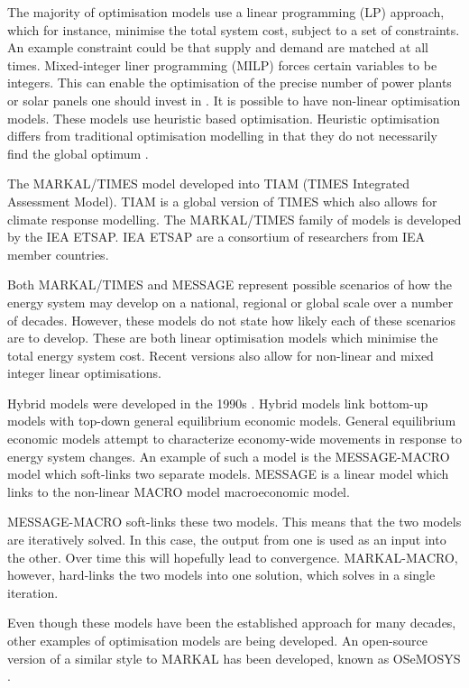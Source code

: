 The majority of optimisation models use a linear programming (LP) approach, which for instance, minimise the total system cost, subject to a set of constraints. An example constraint could be that supply and demand are matched at all times. Mixed-integer liner programming (MILP) forces certain variables to be integers. This can enable the optimisation of the precise number of power plants or solar panels one should invest in \cite{Ringkjob2018}. It is possible to have non-linear optimisation models. These models use heuristic based optimisation. Heuristic optimisation differs from traditional optimisation modelling in that they do not necessarily find the global optimum \cite{Banos2011}.  

The MARKAL/TIMES model developed into TIAM (TIMES Integrated Assessment Model). TIAM is a global version of TIMES which also allows for climate response modelling. The MARKAL/TIMES family of models is developed by the IEA ETSAP. IEA ETSAP are a consortium of researchers from IEA member countries.

Both MARKAL/TIMES and MESSAGE represent possible scenarios of how the energy system may develop on a national, regional or global scale over a number of decades. However, these models do not state how likely each of these scenarios are to develop. These are both linear optimisation models which minimise the total energy system cost. Recent versions also allow for non-linear and mixed integer linear optimisations.

Hybrid models were developed in the 1990s \cite{Economics2016}. Hybrid models link bottom-up models with top-down general equilibrium economic models. General equilibrium economic models attempt to characterize economy-wide movements in response to energy system changes. An example of such a model is the MESSAGE-MACRO model \cite{Messner2000} which soft-links two separate models. MESSAGE is a linear model which links to the non-linear MACRO model macroeconomic model. 

MESSAGE-MACRO soft-links these two models. This means that the two models are iteratively solved. In this case, the output from one is used as an input into the other. Over time this will hopefully lead to convergence. MARKAL-MACRO, however, \cite{mannewene92} hard-links the two models into one solution, which solves in a single iteration.

Even though these models have been the established approach for many decades, other examples of optimisation models are being developed. An open-source version of a similar style to MARKAL has been developed, known as OSeMOSYS \cite{Howells2011}. 

